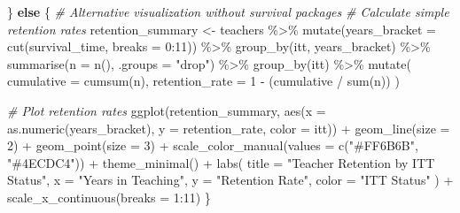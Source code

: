 \documentclass[
]{article}
\newenvironment{Shaded}{\begin{snugshade}}{\end{snugshade}}
\newcommand{\AttributeTok}[1]{\textcolor[rgb]{0.77,0.63,0.00}{#1}}
\newcommand{\CommentTok}[1]{\textcolor[rgb]{0.56,0.35,0.01}{\textit{#1}}}
\newcommand{\ControlFlowTok}[1]{\textcolor[rgb]{0.13,0.29,0.53}{\textbf{#1}}}
\newcommand{\DecValTok}[1]{\textcolor[rgb]{0.00,0.00,0.81}{#1}}
\newcommand{\FunctionTok}[1]{\textcolor[rgb]{0.00,0.00,0.00}{#1}}
\newcommand{\NormalTok}[1]{#1}
\newcommand{\OtherTok}[1]{\textcolor[rgb]{0.56,0.35,0.01}{#1}}
\newcommand{\SpecialCharTok}[1]{\textcolor[rgb]{0.00,0.00,0.00}{#1}}
\newcommand{\StringTok}[1]{\textcolor[rgb]{0.31,0.60,0.02}{#1}}
\begin{document}
\begin{Shaded}
\begin{Highlighting}[]
\NormalTok{\} }\ControlFlowTok{else}\NormalTok{ \{}
  \CommentTok{\# Alternative visualization without survival packages}
  \CommentTok{\# Calculate simple retention rates}
\NormalTok{  retention\_summary }\OtherTok{\textless{}{-}}\NormalTok{ teachers }\SpecialCharTok{\%\textgreater{}\%}
    \FunctionTok{mutate}\NormalTok{(}\AttributeTok{years\_bracket =} \FunctionTok{cut}\NormalTok{(survival\_time, }\AttributeTok{breaks =} \DecValTok{0}\SpecialCharTok{:}\DecValTok{11}\NormalTok{)) }\SpecialCharTok{\%\textgreater{}\%}
    \FunctionTok{group\_by}\NormalTok{(itt, years\_bracket) }\SpecialCharTok{\%\textgreater{}\%}
    \FunctionTok{summarise}\NormalTok{(}\AttributeTok{n =} \FunctionTok{n}\NormalTok{(), }\AttributeTok{.groups =} \StringTok{"drop"}\NormalTok{) }\SpecialCharTok{\%\textgreater{}\%}
    \FunctionTok{group\_by}\NormalTok{(itt) }\SpecialCharTok{\%\textgreater{}\%}
    \FunctionTok{mutate}\NormalTok{(}
      \AttributeTok{cumulative =} \FunctionTok{cumsum}\NormalTok{(n),}
      \AttributeTok{retention\_rate =} \DecValTok{1} \SpecialCharTok{{-}}\NormalTok{ (cumulative }\SpecialCharTok{/} \FunctionTok{sum}\NormalTok{(n))}
\NormalTok{    )}
  
  \CommentTok{\# Plot retention rates}
  \FunctionTok{ggplot}\NormalTok{(retention\_summary, }\FunctionTok{aes}\NormalTok{(}\AttributeTok{x =} \FunctionTok{as.numeric}\NormalTok{(years\_bracket), }\AttributeTok{y =}\NormalTok{ retention\_rate, }\AttributeTok{color =}\NormalTok{ itt)) }\SpecialCharTok{+}
    \FunctionTok{geom\_line}\NormalTok{(}\AttributeTok{size =} \DecValTok{2}\NormalTok{) }\SpecialCharTok{+}
    \FunctionTok{geom\_point}\NormalTok{(}\AttributeTok{size =} \DecValTok{3}\NormalTok{) }\SpecialCharTok{+}
    \FunctionTok{scale\_color\_manual}\NormalTok{(}\AttributeTok{values =} \FunctionTok{c}\NormalTok{(}\StringTok{"\#FF6B6B"}\NormalTok{, }\StringTok{"\#4ECDC4"}\NormalTok{)) }\SpecialCharTok{+}
    \FunctionTok{theme\_minimal}\NormalTok{() }\SpecialCharTok{+}
    \FunctionTok{labs}\NormalTok{(}
      \AttributeTok{title =} \StringTok{"Teacher Retention by ITT Status"}\NormalTok{,}
      \AttributeTok{x =} \StringTok{"Years in Teaching"}\NormalTok{,}
      \AttributeTok{y =} \StringTok{"Retention Rate"}\NormalTok{,}
      \AttributeTok{color =} \StringTok{"ITT Status"}
\NormalTok{    ) }\SpecialCharTok{+}
    \FunctionTok{scale\_x\_continuous}\NormalTok{(}\AttributeTok{breaks =} \DecValTok{1}\SpecialCharTok{:}\DecValTok{11}\NormalTok{)}
\NormalTok{\}}
\end{Highlighting}
\end{Shaded}
\end{document}
